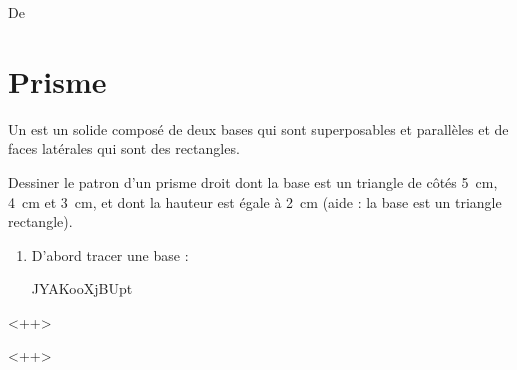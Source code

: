 

De \cite{NRHooXFvgpp5}

\section{Prisme}

\begin{definition}
    Un  est un solide composé de deux bases qui sont superposables et parallèles et de faces latérales qui sont des rectangles.
\end{definition}


\begin{example}
    Dessiner le patron d'un prisme droit dont la base est un triangle de côtés \SI{5}{\centi\meter}, \SI{4}{\centi\meter} et \SI{3}{\centi\meter}, et dont la hauteur est égale à \SI{2}{\centi\meter} (aide : la base est un triangle rectangle).

    \begin{enumerate}
        \item
            D'abord tracer une base :

JYAKooXjBUpt

    \end{enumerate}
    <++>


\end{example}
<++>

